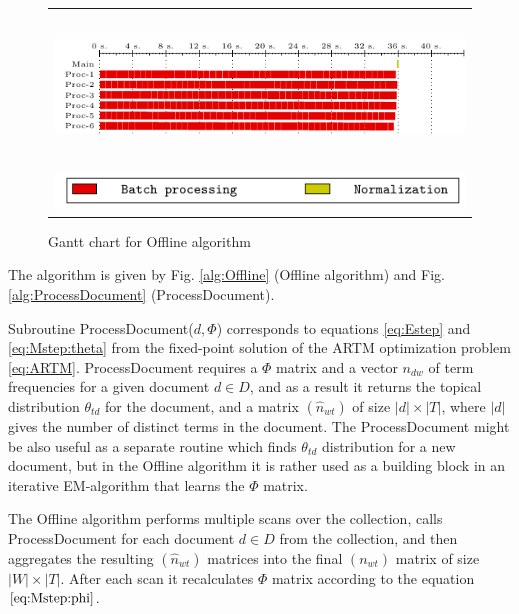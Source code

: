 \documentclass[russian,english]{llncs}
\newcommand{\kw}[1]{\textsf{#1}}
\begin{document}
\begin{figure}[t]
\centering
\begin{tabular}{c}
\includegraphics[height=4cm, width=12cm]{plots/plot_nytimes_offline_300.pdf} \\
\includegraphics[scale=1]{plots/plot_legend_offline.pdf}
\end{tabular}
\caption{Gantt chart for Offline algorithm} \label{fig:gantt:offline}
\end{figure}

The algorithm is given by
Fig. \ref{alg:Offline} (\kw{Offline algorithm}) and
Fig. \ref{alg:ProcessDocument} (\kw{ProcessDocument}).

Subroutine \kw{ProcessDocument($d, \Phi$)} corresponds to equations \eqref{eq:Estep} and \eqref{eq:Mstep:theta} from the fixed-point solution of the ARTM optimization problem \eqref{eq:ARTM}.
\kw{ProcessDocument} requires a $\Phi$ matrix
and a vector $n_{dw}$ of term frequencies for a given document $d \in D$,
and as a result it returns the topical distribution $\theta_{td}$ for the document,
and a matrix $(\hat n_{wt})$ of size $|d| \times |T|$,
where $|d|$ gives the number of distinct terms in the document.
The \kw{ProcessDocument} might be also useful as a separate routine which finds $\theta_{td}$ distribution for a new document,
but in the \kw{Offline algorithm} it is rather used as a building block in an iterative EM-algorithm that learns the $\Phi$ matrix.

The \kw{Offline algorithm} performs multiple scans over the collection, calls \kw{ProcessDocument}
for each document $d \in D$ from the collection,
and then aggregates the resulting $(\hat n_{wt})$ matrices into the final $(n_{wt})$ matrix of size $|W| \times |T|$.
After each scan it recalculates $\Phi$ matrix according to the equation $\eqref{eq:Mstep:phi}$.
\end{document}
